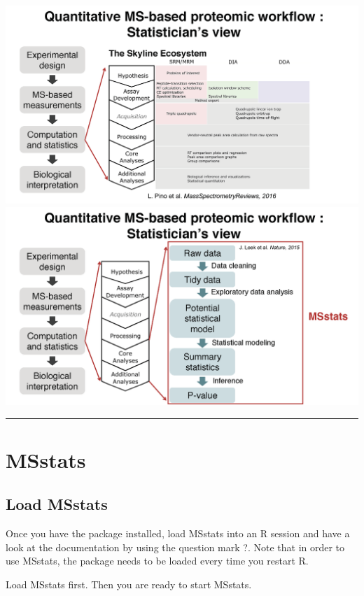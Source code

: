 \documentclass[]{book}
\begin{document}
\includegraphics{img/MSstats_intro2.png}
\includegraphics{img/MSstats_intro3.png}

\begin{center}\rule{0.5\linewidth}{\linethickness}\end{center}

\hypertarget{msstats}{%
\chapter{MSstats}\label{msstats}}

\hypertarget{load-msstats}{%
\section{Load MSstats}\label{load-msstats}}

Once you have the package installed, load MSstats into an R session and have a look at the documentation by using the question mark ?. Note that in order to use MSstats, the package needs to be loaded every time you restart R.

Load MSstats first. Then you are ready to start MSstats.
\end{document}
